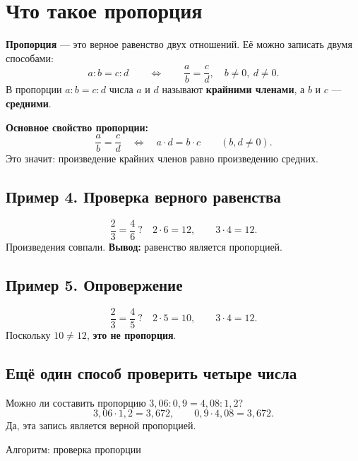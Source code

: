 \documentclass[a4paper,12pt]{article}
\newcommand{\key}[1]{\textcolor{darkaccent}{\textbf{#1}}}
\begin{document}
\section{Что такое пропорция}

\key{Пропорция} --- это верное равенство двух отношений. Её можно записать двумя способами:
\[
\boxed{a:b=c:d\qquad\Longleftrightarrow\qquad\frac{a}{b}=\frac{c}{d}},
\quad b\ne0,\ d\ne0.
\]
В пропорции \(a:b=c:d\) числа \(a\) и \(d\) называют \key{крайними членами}, а \(b\) и \(c\) --- \key{средними}.

\key{Основное свойство пропорции:}
\[
\boxed{\frac{a}{b}=\frac{c}{d}\quad\Longleftrightarrow\quad a\cdot d=b\cdot c}
\qquad (b,d\ne0).
\]
Это значит: произведение крайних членов равно произведению средних.

\subsection{Пример 4. Проверка верного равенства}
\[
\frac{2}{3}=\frac{4}{6}\ ?\quad
2\cdot6=12,\qquad 3\cdot4=12.
\]
Произведения совпали. \key{Вывод:} равенство является пропорцией.

\subsection{Пример 5. Опровержение}
\[
\frac{2}{3}=\frac{4}{5}\ ?\quad
2\cdot5=10,\qquad 3\cdot4=12.
\]
Поскольку \(10\ne12\), \key{это не пропорция}.

\subsection{Ещё один способ проверить четыре числа}
Можно ли составить пропорцию \(3{,}06:0{,}9=4{,}08:1{,}2\)?
\[
3{,}06\cdot1{,}2=3{,}672,\qquad
0{,}9\cdot4{,}08=3{,}672.
\]
Да, эта запись является верной пропорцией.

\clearpage
\thispagestyle{empty}
\begin{center}
{\Large\color{darkaccent} Алгоритм: проверка пропорции}
\end{center}
\vspace{16mm}
\begin{center}
\end{center}
\clearpage
\end{document}

